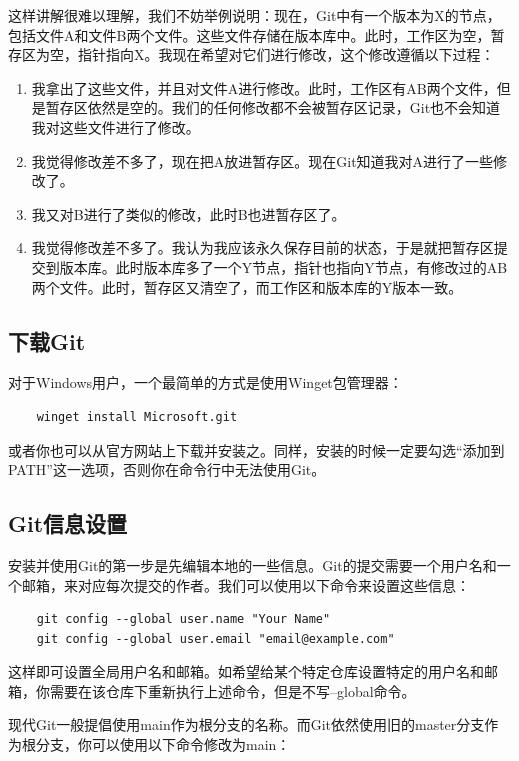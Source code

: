 \documentclass[fontset=none]{ctexart}
\begin{document}
这样讲解很难以理解，我们不妨举例说明：现在，Git中有一个版本为X的节点，包括文件A和文件B两个文件。这些文件存储在版本库中。此时，工作区为空，暂存区为空，指针指向X。我现在希望对它们进行修改，这个修改遵循以下过程：

\begin{enumerate}
    \item 我拿出了这些文件，并且对文件A进行修改。此时，工作区有AB两个文件，但是暂存区依然是空的。我们的任何修改都不会被暂存区记录，Git也不会知道我对这些文件进行了修改。
    \item 我觉得修改差不多了，现在把A放进暂存区。现在Git知道我对A进行了一些修改了。
    \item 我又对B进行了类似的修改，此时B也进暂存区了。
    \item 我觉得修改差不多了。我认为我应该永久保存目前的状态，于是就把暂存区提交到版本库。此时版本库多了一个Y节点，指针也指向Y节点，有修改过的AB两个文件。此时，暂存区又清空了，而工作区和版本库的Y版本一致。
\end{enumerate}

\subsection{下载Git}

对于Windows用户，一个最简单的方式是使用Winget包管理器：

\begin{verbatim}
    winget install Microsoft.git
\end{verbatim}

或者你也可以从官方网站上下载并安装之。同样，安装的时候一定要勾选“添加到PATH”这一选项，否则你在命令行中无法使用Git。

\subsection{Git信息设置}

安装并使用Git的第一步是先编辑本地的一些信息。Git的提交需要一个用户名和一个邮箱，来对应每次提交的作者。我们可以使用以下命令来设置这些信息：

\begin{verbatim}
    git config --global user.name "Your Name"
    git config --global user.email "email@example.com"
\end{verbatim}

这样即可设置全局用户名和邮箱。如希望给某个特定仓库设置特定的用户名和邮箱，你需要在该仓库下重新执行上述命令，但是不写--global命令。

现代Git一般提倡使用main作为根分支的名称。而Git依然使用旧的master分支作为根分支，你可以使用以下命令修改为main：
\end{document}
